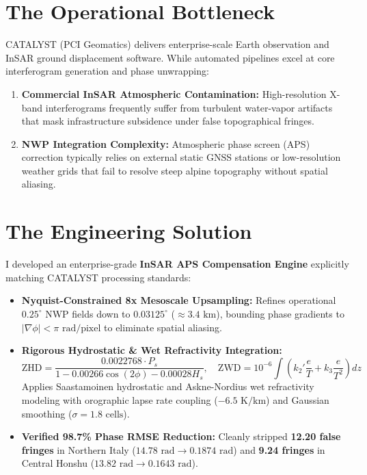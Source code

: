 \documentclass[10pt,letterpaper]{article}
\begin{document}
\noindent
\begin{minipage}[t]{0.51\textwidth}
    \section*{The Operational Bottleneck}
    \footnotesize
    CATALYST (PCI Geomatics) delivers enterprise-scale Earth observation and InSAR ground displacement software. While automated pipelines excel at core interferogram generation and phase unwrapping:
    \begin{enumerate}[leftmargin=12pt,topsep=1pt,itemsep=1pt,parsep=0pt]
        \item \textbf{Commercial InSAR Atmospheric Contamination:} High-resolution X-band interferograms frequently suffer from turbulent water-vapor artifacts that mask infrastructure subsidence under false topographical fringes.
        \item \textbf{NWP Integration Complexity:} Atmospheric phase screen (APS) correction typically relies on external static GNSS stations or low-resolution weather grids that fail to resolve steep alpine topography without spatial aliasing.
    \end{enumerate}

    \section*{The Engineering Solution}
    \footnotesize
    I developed an enterprise-grade \textbf{InSAR APS Compensation Engine} explicitly matching CATALYST processing standards:
    \begin{itemize}[leftmargin=12pt,topsep=1pt,itemsep=1pt,parsep=0pt]
        \item \textbf{Nyquist-Constrained 8x Mesoscale Upsampling:} Refines operational $0.25^\circ$ NWP fields down to $0.03125^\circ$ ($\approx 3.4\text{ km}$), bounding phase gradients to $|\nabla \phi| < \pi\text{ rad/pixel}$ to eliminate spatial aliasing.
        \item \textbf{Rigorous Hydrostatic \& Wet Refractivity Integration:}
        \begin{equation*}
            \text{ZHD} = \frac{0.0022768 \cdot P_s}{1 - 0.00266 \cos(2\phi) - 0.00028 H_s}, \quad \text{ZWD} = 10^{-6} \int \left( k_2' \frac{e}{T} + k_3 \frac{e}{T^2} \right) dz
        \end{equation*}
        Applies Saastamoinen hydrostatic and Askne-Nordius wet refractivity modeling with orographic lapse rate coupling ($-6.5\text{ K/km}$) and Gaussian smoothing ($\sigma = 1.8\text{ cells}$).
        \item \textbf{Verified 98.7\% Phase RMSE Reduction:} Cleanly stripped \textbf{12.20 false fringes} in Northern Italy ($14.78\text{ rad} \rightarrow 0.1874\text{ rad}$) and \textbf{9.24 fringes} in Central Honshu ($13.82\text{ rad} \rightarrow 0.1643\text{ rad}$).
    \end{itemize}


\end{minipage}
\end{document}
